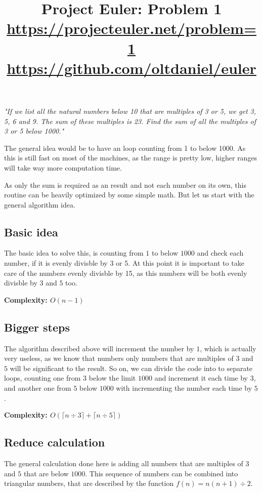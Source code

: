 \documentclass[12pt,notitlepage]{article}
\title{Project Euler: Problem 1
\\\small{\url{https://projecteuler.net/problem=1}}\\
\small{\url{https://github.com/oltdaniel/euler}}}
\begin{document}
  \maketitle

  \begin{center}
    \textit{"If we list all the natural numbers below 10 that are multiples of 3 or 5, we get 3, 5, 6 and 9. The sum of these multiples is 23. Find the sum of all the multiples of 3 or 5 below 1000."}
  \end{center}

  The general idea would be to have an loop counting from 1 to below 1000. As this is still
  fast on most of the machines, as the range is pretty low, higher ranges will take way more
  computation time.\par

  As only the sum is required as an result and not each number on its own, this routine can
  be heavily optimized by some simple math. But let us start with the general algorithm idea.

  \subsection{Basic idea}
  The basic idea to solve this, is counting from $1$ to below $1000$ and check each number, if it is
  evenly divisble by 3 or 5. At this point it is important to take care of the numbers evenly
  divisble by 15, as this numbers will be both evenly divisble by $3$ and $5$ too.\par
  \textbf{Complexity: $O(n - 1)$}

  \subsection{Bigger steps}
  The algorithm described above will increment the number by $1$, which is actually very
  useless, as we know that numbers only numbers that are multiples of $3$ and $5$ will be significant
  to the result. So on, we can divide the code into to separate loops, counting one from $3$ below
  the limit $1000$  and increment it each time by $3$, and another one from $5$ below $1000$
  with incrementing the number each time by $5$.\par
  \textbf{Complexity: $O(\lceil n \div 3 \rceil + \lceil n \div 5 \rceil)$}

  \subsection{Reduce calculation}
  The general calculation done here is adding all numbers that are multiples of $3$ and $5$ that
  are below $1000$. This sequence of numbers can be combined into triangular numbers, that are described
  by the function $f(n) = n ( n + 1 ) \div 2$.\par
\end{document}
